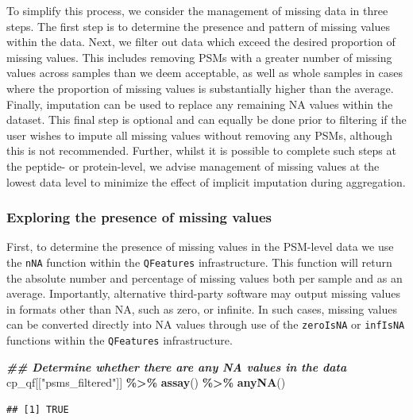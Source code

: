\documentclass[9pt,a4paper,]{extarticle}
\newenvironment{Shaded}{\begin{snugshade}}{\end{snugshade}}
\newcommand{\DocumentationTok}[1]{\textcolor[rgb]{0.56,0.35,0.01}{\textbf{\textit{#1}}}}
\newcommand{\FunctionTok}[1]{\textcolor[rgb]{0.13,0.29,0.53}{\textbf{#1}}}
\newcommand{\NormalTok}[1]{#1}
\newcommand{\SpecialCharTok}[1]{\textcolor[rgb]{0.81,0.36,0.00}{\textbf{#1}}}
\newcommand{\StringTok}[1]{\textcolor[rgb]{0.31,0.60,0.02}{#1}}
\begin{document}
To simplify this process, we consider the management of missing data in three
steps. The first step is to determine the presence and pattern of missing values
within the data. Next, we filter out data which exceed the desired proportion of
missing values. This includes removing PSMs with a greater number of missing
values across samples than we deem acceptable, as well as whole samples in cases
where the proportion of missing values is substantially higher than the average.
Finally, imputation can be used to replace any remaining NA values within the
dataset. This final step is optional and can equally be done prior to filtering
if the user wishes to impute all missing values without removing any PSMs,
although this is not recommended. Further, whilst it is possible to complete
such steps at the peptide- or protein-level, we advise management of missing
values at the lowest data level to minimize the effect of implicit imputation
during aggregation.

\hypertarget{exploring-the-presence-of-missing-values}{%
\subsubsection{Exploring the presence of missing values}\label{exploring-the-presence-of-missing-values}}

First, to determine the presence of missing values in the PSM-level data we use
the \texttt{nNA} function within the \texttt{QFeatures} infrastructure. This function will
return the absolute number and percentage of missing values both per sample and
as an average. Importantly, alternative third-party software may output missing
values in formats other than NA, such as zero, or infinite. In such cases,
missing values can be converted directly into NA values through use of the
\texttt{zeroIsNA} or \texttt{infIsNA} functions within the \texttt{QFeatures} infrastructure.

\begin{Shaded}
\begin{Highlighting}[]
\DocumentationTok{\#\# Determine whether there are any NA values in the data}
\NormalTok{cp\_qf[[}\StringTok{"psms\_filtered"}\NormalTok{]] }\SpecialCharTok{\%\textgreater{}\%}
  \FunctionTok{assay}\NormalTok{() }\SpecialCharTok{\%\textgreater{}\%}
  \FunctionTok{anyNA}\NormalTok{()}
\end{Highlighting}
\end{Shaded}

\begin{verbatim}
## [1] TRUE
\end{verbatim}
\end{document}
